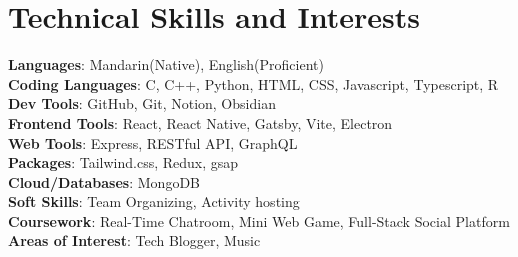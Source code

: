 \documentclass[a4paper,11pt]{article}
\begin{document}
\section{\textbf{Technical Skills and Interests}}
 \begin{itemize}[leftmargin=0.05in, label={}]
    \small{\item{
     \textbf{Languages}{: Mandarin(Native), English(Proficient)} \\
     \textbf{Coding Languages}{: C, C++, Python, HTML, CSS, Javascript, Typescript, R} \\
     \textbf{Dev Tools}{: GitHub, Git, Notion, Obsidian} \\
     \textbf{Frontend Tools}{: React, React Native, Gatsby, Vite, Electron} \\
     \textbf{Web Tools}{: Express, RESTful API, GraphQL} \\
     \textbf{Packages}{: Tailwind.css, Redux, gsap} \\
     \textbf{Cloud/Databases}{: MongoDB} \\
     \textbf{Soft Skills}{: Team Organizing, Activity hosting} \\
     \textbf{Coursework}{: Real-Time Chatroom, Mini Web Game, Full-Stack Social Platform} \\
     \textbf{Areas of Interest}{: Tech Blogger, Music} \\
    }}
 \end{itemize}
 \vspace{-16pt}


\end{document}
